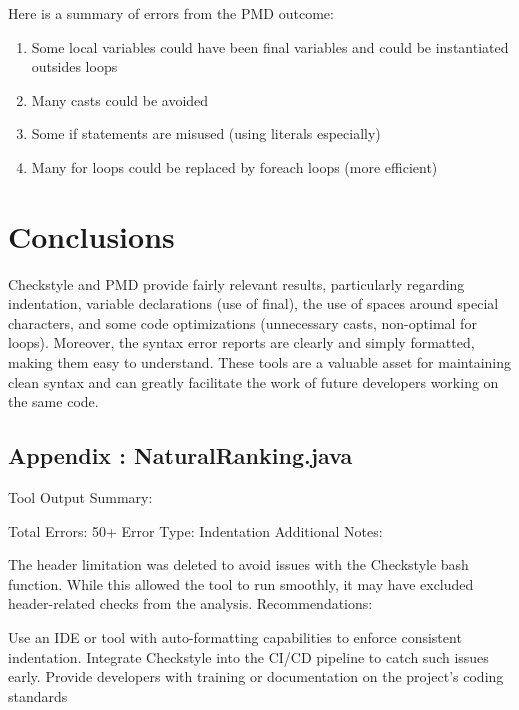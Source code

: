\documentclass[twocolumn,10pt]{article}
\begin{document}
Here is a summary of errors from the PMD outcome:
\begin{enumerate}[itemsep=0pt, topsep=0pt]
    \item Some local variables could have been final variables and could be instantiated outsides loops
    \item Many casts could be avoided 
    \item Some if statements are misused (using literals especially)
    \item Many for loops could be replaced by foreach loops (more efficient)    
\end{enumerate}

\section{Conclusions}

Checkstyle and PMD provide fairly relevant results, particularly regarding indentation, variable declarations (use of final), the use of spaces around special characters, and some code optimizations (unnecessary casts, non-optimal for loops).
Moreover, the syntax error reports are clearly and simply formatted, making them easy to understand. These tools are a valuable asset for maintaining clean syntax and can greatly facilitate the work of future developers working on the same code.

\newpage

\begin{appendix}
\section{Appendix : NaturalRanking.java}

\end{appendix}

Tool Output Summary:

Total Errors: 50+
Error Type: Indentation
Additional Notes:

The header limitation was deleted to avoid issues with the Checkstyle bash function. While this allowed the tool to run smoothly, it may have excluded header-related checks from the analysis.
Recommendations:

Use an IDE or tool with auto-formatting capabilities to enforce consistent indentation.
Integrate Checkstyle into the CI/CD pipeline to catch such issues early.
Provide developers with training or documentation on the project's coding standards
\end{document}
